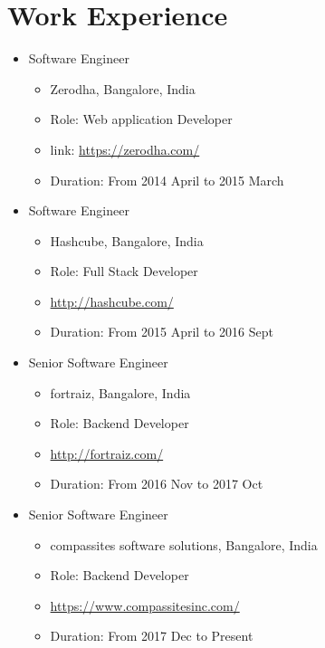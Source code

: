 \documentclass[11pt,a4paper]{moderncv}
\begin{document}
\section{Work Experience}
    \begin{itemize}
        \item Software Engineer
        \begin{itemize}
            \item Zerodha, Bangalore, India
            \item Role: Web application Developer
            \item link: {\url{https://zerodha.com/}}
            \item Duration: From 2014 April to 2015 March 
        \end{itemize}
    \end{itemize}
    \begin{itemize}
        \item Software Engineer
        \begin{itemize}
            \item Hashcube, Bangalore, India
            \item Role: Full Stack Developer  
            \item {\url{http://hashcube.com/}}
            \item Duration: From 2015 April to 2016 Sept
        \end{itemize}
    \end{itemize}
    \begin{itemize}
        \item Senior Software Engineer
        \begin{itemize}
            \item fortraiz, Bangalore, India
            \item Role: Backend Developer
            \item {\url{http://fortraiz.com/}}
            \item Duration: From 2016 Nov to 2017 Oct 
        \end{itemize}
    \end{itemize}
    \begin{itemize}
        \item Senior Software Engineer
        \begin{itemize}
            \item compassites software solutions, Bangalore, India
            \item Role: Backend Developer
            \item {\url{https://www.compassitesinc.com/}}
            \item Duration: From 2017 Dec to Present 
        \end{itemize}
    \end{itemize}
\pagebreak
\end{document}
